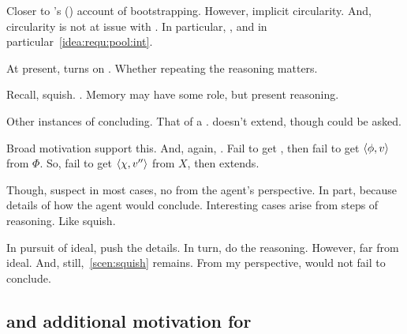 \begin{note}
{  \nocite{Weisberg:2012vs}
  Closer to \citeauthor{Weisberg:2010to}'s (\citeyear{Weisberg:2010to}) account of bootstrapping.
  However, implicit circularity.
  And, circularity is not at issue with \qzS{}.
  In particular, \requ{}, and in particular~\ref{idea:requ:pool:int}.
  }

  At present, turns on \requ{}.
  Whether repeating the reasoning matters.

  Recall, squish.
  \requ{}.
  Memory may have some role, but present reasoning.
\end{note}

\begin{note}
  Other instances of concluding.
  That of a \requ{}.
  \qzS{} doesn't extend, though \qzS{} could be asked.

  Broad motivation support this.
  And, again, .
  Fail to get \requ{}, then fail to get \(\langle \phi, v \rangle\) from \(\Phi\).
  So, fail to get \(\langle \chi, v'' \rangle\) from \(X\), then extends.

  Though, suspect in most cases, no \requ{} from the agent's perspective.
  In part, because details of how the agent would conclude.
  Interesting cases arise from steps of reasoning.
  Like squish.

  In pursuit of ideal, push the details.
  In turn, do the reasoning.
  However, far from ideal.
  And, still,~\autoref{scen:squish} remains.
  From my perspective, would not fail to conclude.
\end{note}

\subsection{\zSXp{} and additional motivation for \qzS{}}
\label{cha:zS:sec:question:zS}

